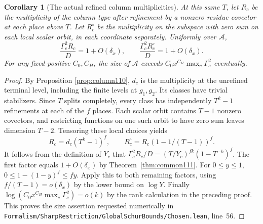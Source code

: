 \documentclass[a4paper,11pt]{article}
\newtheorem{corollary}[proposition]{Corollary}
\theoremstyle{definition}
\theoremstyle{remark}
\newcommand{\srcloc}[2]{{\small\nolinkurl{#1.lean}}, line~#2}
\numberwithin{equation}{section}
\begin{document}
\begin{corollary}[The actual refined column multiplicities]\label{cor:rank111}
At this same \(T\), let \(R_c\) be the multiplicity of the
column type after refinement by a nonzero residue covector at
each place above \(T\). Let \(R_c^\circ\) be the multiplicity
on the subspace with zero sum on each local scalar orbit, in
each coordinate separately. Uniformly over \(\mathcal A\),
\[
    \frac{\Gamma_c^2 R_c}{D}=1+O(\delta_x),
       \qquad \frac{\Gamma_c^2 R_c^\circ}{D}=1+O(\delta_x).
\]
For any fixed positive \(C_0,C_H\), the size of \(\mathcal A\)
exceeds \(C_0x^{C_H}\max_c\Gamma_c^2\) eventually.
\end{corollary}
\begin{proof}
By Proposition \ref{prop:column110}, \(d_c\) is the multiplicity at the
unrefined terminal level, including the finite levels at
\(g_1,g_2\). Its classes have trivial stabilizers. Since \(T\)
splits completely, every class has independently \(T^k-1\)
refinements at each of the \(f\) places. Each scalar orbit
contains \(T-1\) nonzero covectors, and restricting functions
on one such orbit to have zero sum leaves dimension \(T-2\).
Tensoring these local choices yields
\[
 R_c=d_c(T^k-1)^f,\qquad
 R_c^\circ=R_c(1-1/(T-1))^f.
\]
It follows from the definition of \(Y_c\) that
\(\Gamma_c^2R_c/D=(T/Y_c)^{fk}(1-T^{-k})^f\).
The first factor equals \(1+O(\delta_x)\) by
Theorem~\ref{thm:common111}. For \(0\le y\le1\),
\(0\le 1-(1-y)^f\le fy\). Apply this to both remaining
factors, using \(f/(T-1)=o(\delta_x)\) by the lower bound
on \(\log Y\). Finally \(\log(C_0 x^{C_H}\max_c\Gamma_c^2)=o(k)\)
by the rank calculation in the preceding proof. This proves
the size assertion requested numerically in
\srcloc{Formalism/SharpRestriction/GlobalSchurBounds/Chosen}{56}.
\end{proof}
\end{document}
